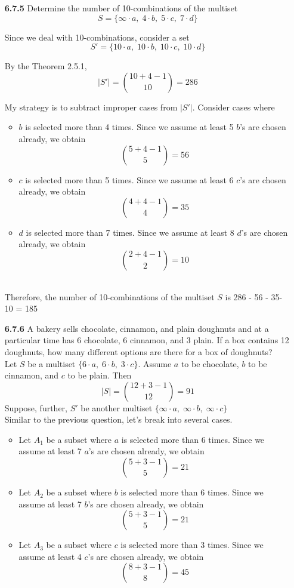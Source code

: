\documentclass[12pt]{article}
\begin{document}
\begin{enumerate}
    \item[\bf 6.7.5] Determine the number of 10-combinations of the multiset
    $$S = \{ \infty\cdot a,\;4\cdot b,\; 5\cdot c,\; 7\cdot d\}$$
    
   Since we deal with 10-combinations, consider a set $$S' = \{10\cdot a,\; 10\cdot b,\; 10\cdot c,\; 10\cdot d\}$$
    
    By the Theorem 2.5.1, 
    $$|S'| = \binom{10 + 4-1}{10} = 286$$
    
    My strategy is to subtract improper cases from $|S'|$. Consider cases where
    \begin{itemize}
        \item $b$ is selected more than 4 times. Since we assume at least 5 $b$'s are chosen already, we obtain
        $$\binom{5+4-1}{5} = 56$$
        \item $c$ is selected more than 5 times. Since we assume at least 6 $c$'s are chosen already, we obtain
        $$\binom{4+4-1}{4} = 35$$
        \item $d$ is selected more than 7 times. Since we assume at least 8 $d$'s are chosen already, we obtain
        $$\binom{2+4-1}{2} = 10$$\\
    \end{itemize}
    
    Therefore, the number of 10-combinations of the multiset $S$ is 286 - 56 - 35- 10 = 185
    
    \vspace{2\baselineskip}
    \item[\bf 6.7.6] A bakery sells chocolate, cinnamon, and plain doughnuts and at a particular time has 6 chocolate, 6 cinnamon, and 3 plain. If a box contains 12 doughnuts, how many different options are there for a box of doughnuts?\\
    
    Let $S$ be a multiset $\{6\cdot a,\; 6\cdot b,\; 3\cdot c\}$. Assume $a$ to be chocolate, $b$ to be cinnamon, and $c$ to be plain. Then
    $$|S| = \binom{12+3-1}{12} = 91$$
    Suppose, further, $S'$ be another multiset $\{\infty\cdot a,\;\infty\cdot b,\;\infty\cdot c\}$\\
    
    Similar to the previous question, let's break into several cases.
    \begin{itemize}
        \item Let $A_1$ be a subset where $a$ is selected more than 6 times. Since we assume at least 7 $a$'s are chosen already, we obtain
        $$\binom{5+3-1}{5} = 21$$
        \item Let $A_2$ be a subset where $b$ is selected more than 6 times. Since we assume at least 7 $b$'s are chosen already, we obtain
        $$\binom{5+3-1}{5} = 21$$
        \item Let $A_3$ be a subset where $c$ is selected more than 3 times. Since we assume at least 4 $c$'s are chosen already, we obtain
        $$\binom{8+3-1}{8} = 45$$\\
        

\end{itemize}
\end{enumerate}
\end{document}
